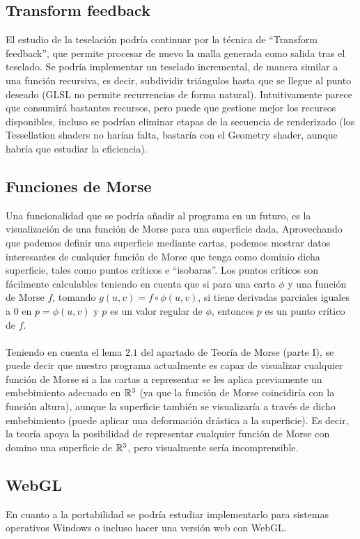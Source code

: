 \subsection*{Transform feedback}
El estudio de la teselación podría continuar por la técnica de ``Transform feedback'', que permite procesar de nuevo la malla generada como salida tras el teselado. Se podría implementar un teselado incremental, de manera similar a una función recursiva, es decir, subdividir triángulos hasta que se llegue al punto deseado (GLSL no permite recurrencias de forma natural). Intuitivamente parece que consumirá bastantes recursos, pero puede que gestione mejor los recursos disponibles, incluso se podrían eliminar etapas de la secuencia de renderizado (los Tessellation shaders no harían falta, bastaría con el Geometry shader, aunque habría que estudiar la eficiencia).\\

\subsection*{Funciones de Morse}
Una funcionalidad que se podría añadir al programa en un futuro, es la visualización de una función de Morse para una superficie dada. Aprovechando que podemos definir una superficie mediante cartas, podemos mostrar datos interesantes de cualquier función de Morse que tenga como dominio dicha superficie, tales como puntos críticos e ``isobaras''. Los puntos críticos son fácilmente calculables teniendo en cuenta que si para una carta $\phi$ y una función de Morse $f$, tomando $g(u,v)=f \circ \phi (u,v)$, si tiene derivadas parciales iguales a $0$ en $p=\phi(u,v)$ y $p$ es un valor regular de $\phi$, entonces $p$ es un punto crítico de $f$.\\
\\Teniendo en cuenta el lema $2.1$ del apartado de Teoría de Morse (parte I), se puede decir que nuestro programa actualmente es capaz de visualizar cualquier función de Morse si a las cartas a representar se les aplica previamente un embebimiento adecuado en $\mathbb{R}^3$ (ya que la función de Morse coincidiría con la función altura), aunque la superficie también se visualizaría a través de dicho embebimiento (puede aplicar una deformación drástica a la superficie). Es decir, la teoría apoya la posibilidad de representar cualquier función de Morse con domino una superficie de $\mathbb{R}^3$, pero visualmente sería incomprensible.

\subsection*{WebGL}
En cuanto a la portabilidad se podría estudiar implementarlo para sistemas operativos Windows o incluso hacer una versión web con WebGL.\\


